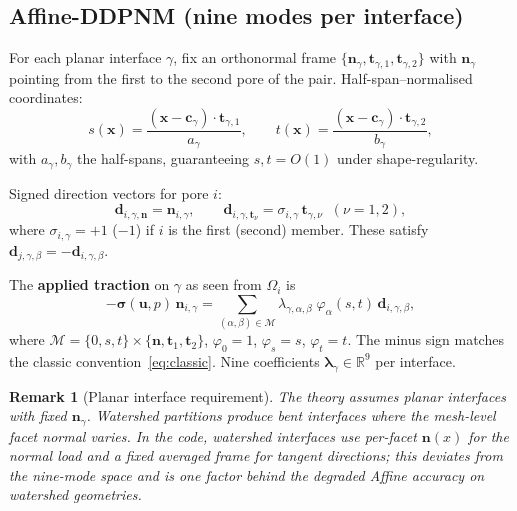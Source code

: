 \documentclass[11pt,a4paper]{article}
\newtheorem{remark}{Remark}
\newcommand{\R}{\mathbb{R}}
\newcommand{\pore}[1]{\Omega_{#1}}
\newcommand{\vel}{\bm{u}}
\newcommand{\pres}{p}
\newcommand{\stress}{\bm{\sigma}}
\newcommand{\normal}{\bm{n}}
\newcommand{\trac}{\bm{\lambda}}
\newcommand{\modeset}{\mathcal{M}}
\begin{document}
\subsection{Affine-DDPNM (nine modes per interface)}

For each planar interface $\gamma$, fix an orthonormal frame
$\{\normal_\gamma,\bm{t}_{\gamma,1},\bm{t}_{\gamma,2}\}$ with
$\normal_\gamma$ pointing from the first to the second pore of the pair.
Half-span--normalised coordinates:
\begin{equation}\label{eq:coords}
  s(\bm{x}) = \frac{(\bm{x}-\bm{c}_\gamma)\cdot\bm{t}_{\gamma,1}}{a_\gamma},\qquad
  t(\bm{x}) = \frac{(\bm{x}-\bm{c}_\gamma)\cdot\bm{t}_{\gamma,2}}{b_\gamma},
\end{equation}
with $a_\gamma,b_\gamma$ the half-spans, guaranteeing $s,t=O(1)$ under
shape-regularity.

Signed direction vectors for pore $i$:
\begin{equation}\label{eq:signed-dir}
  \bm{d}_{i,\gamma,\normal} = \normal_{i,\gamma},\qquad
  \bm{d}_{i,\gamma,\bm{t}_\nu} = \sigma_{i,\gamma}\,\bm{t}_{\gamma,\nu}
  \;\;(\nu=1,2),
\end{equation}
where $\sigma_{i,\gamma}=+1$ ($-1$) if $i$ is the first (second) member.
These satisfy $\bm{d}_{j,\gamma,\beta} = -\bm{d}_{i,\gamma,\beta}$.

The \textbf{applied traction} on $\gamma$ as seen from $\pore{i}$ is
\begin{equation}\label{eq:affine-traction}
  -\stress(\vel,\pres)\,\normal_{i,\gamma}
  = \sum_{(\alpha,\beta)\in\modeset}
    \lambda_{\gamma,\alpha,\beta}\;
    \varphi_\alpha(s,t)\,\bm{d}_{i,\gamma,\beta},
\end{equation}
where $\modeset = \{0,s,t\}\times\{\normal,\bm{t}_1,\bm{t}_2\}$,
$\varphi_0=1$, $\varphi_s=s$, $\varphi_t=t$.
The minus sign matches the classic convention~\eqref{eq:classic}.
Nine coefficients $\trac_\gamma \in \R^9$ per interface.

\begin{remark}[Planar interface requirement]\label{rem:planar}
  The theory assumes planar interfaces with fixed $\normal_\gamma$.
  Watershed partitions produce bent interfaces where the mesh-level
  facet normal varies.  In the code, watershed interfaces use
  per-facet $\normal(x)$ for the normal load and a fixed averaged frame
  for tangent directions; this deviates from the nine-mode space and is
  one factor behind the degraded Affine accuracy on watershed geometries.
\end{remark}
\end{document}
